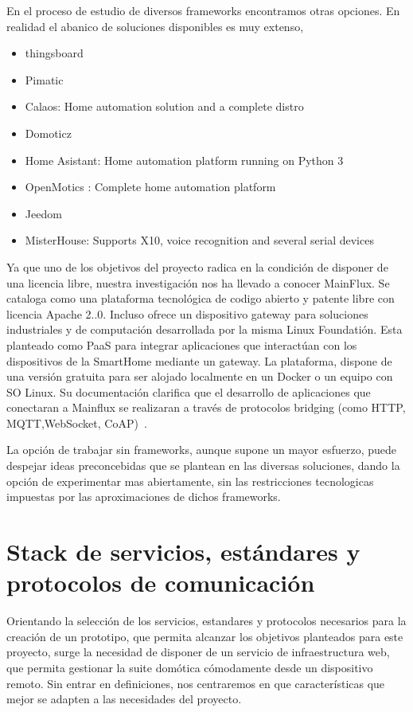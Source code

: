 \vspace{1.5cm}

En el proceso de estudio de diversos frameworks encontramos otras opciones. En realidad el abanico de soluciones disponibles es muy extenso,

\begin{itemize}
\item thingsboard
\item Pimatic
\item Calaos: Home automation solution and a complete distro
\item Domoticz
\item Home Asistant: Home automation platform running on Python 3
\item OpenMotics : Complete home automation platform
\item Jeedom
\item MisterHouse: Supports X10, voice recognition and several serial devices
\end{itemize}

Ya que uno de los objetivos del proyecto radica en la condición de disponer de una licencia libre, nuestra investigación nos ha llevado a conocer MainFlux. Se cataloga como una plataforma tecnológica de codigo abierto y patente libre con licencia Apache 2..0. Incluso ofrece un dispositivo gateway para soluciones industriales y de computación desarrollada por la misma Linux Foundatión. Esta planteado como PaaS para integrar aplicaciones que interactúan con los dispositivos de la SmartHome mediante un gateway. La plataforma, dispone de una versión gratuita para ser alojado localmente en un Docker o un equipo con SO Linux. Su documentación clarifica que el desarrollo de aplicaciones que conectaran a Mainflux se realizaran a través de protocolos bridging (como HTTP, MQTT,WebSocket, CoAP)~\cite{mainfluxdoc}.


La opción de trabajar sin frameworks, aunque supone un mayor esfuerzo, puede despejar ideas preconcebidas que se plantean en las diversas soluciones, dando la opción de experimentar mas abiertamente, sin las restricciones tecnologicas impuestas por las aproximaciones de dichos frameworks.

\section{Stack de servicios, estándares y  protocolos de comunicación}
\label{ch:Capitulo2.3}



Orientando la selección de los servicios, estandares y protocolos necesarios para la creación de un prototipo, que permita alcanzar los objetivos planteados para este proyecto, surge la necesidad de disponer de un servicio de infraestructura web, que permita gestionar la suite domótica cómodamente desde un dispositivo remoto. Sin entrar en definiciones, nos centraremos en que características que mejor se adapten a las necesidades del proyecto.

